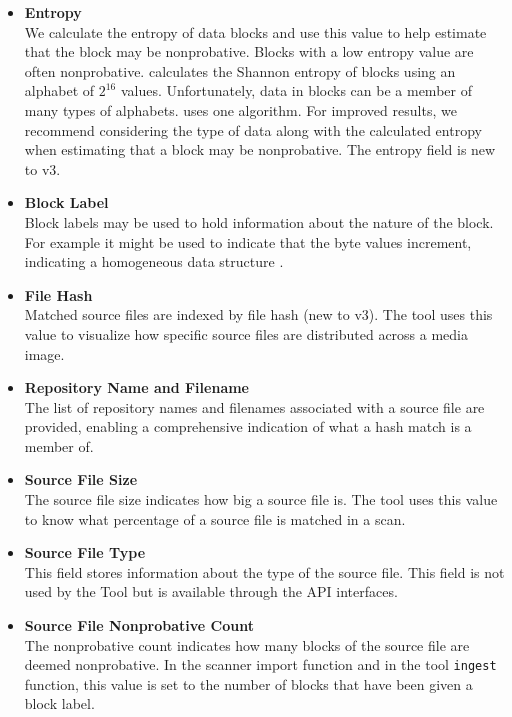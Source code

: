 \documentclass[11pt,fleqn]{article} %
\begin{document}
\begin{itemize}
\item \textbf{Entropy}\\
We calculate the entropy of data blocks and use this value to help estimate that the block may be nonprobative. Blocks with a low entropy value are often nonprobative. \hdb calculates the Shannon entropy of blocks using an alphabet of $2^{16}$ values. Unfortunately, data in blocks can be a member of many types of alphabets. \hdb uses one algorithm.  For improved results, we recommend considering the type of data along with the calculated entropy when estimating that a block may be nonprobative. The entropy field is new to \hdb v3.
\item \textbf{Block Label}\\
Block labels may be used to hold information about the nature of the block.  For example it might be used to indicate that the byte values increment, indicating a homogeneous data structure \cite{hashBasedCarving}.
\item \textbf{File Hash}\\
Matched source files are indexed by file hash (new to \hdb v3). The \sscope tool uses this value to visualize how specific source files are distributed across a media image.
\item \textbf{Repository Name and Filename}\\
The list of repository names and filenames associated with a source file are provided, enabling a comprehensive indication of what a hash match is a member of.
\item \textbf{Source File Size}\\
The source file size indicates how big a source file is. The \sscope tool uses this value to know what percentage of a source file is matched in a scan.
\item \textbf{Source File Type}\\
This field stores information about the type of the source file. This field is not used by the \hdb Tool but is available through the \hdb API interfaces.
\item \textbf{Source File Nonprobative Count}\\
The nonprobative count indicates how many blocks of the source file are deemed nonprobative. In the \bulk \hdb scanner import function and in the \hdb tool \verb+ingest+ function, this value is set to the number of blocks that have been given a block label.
\end{itemize}
\end{document}
